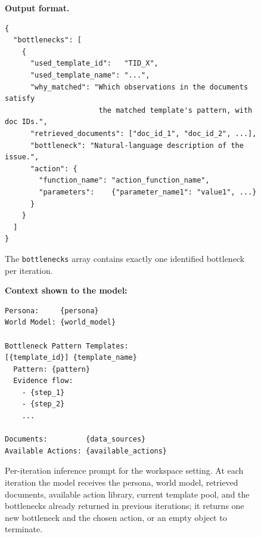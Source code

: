 \begin{figure}[!t]
\begin{tcolorbox}[colback=gray!5, colframe=gray!50,
                  boxrule=0.5pt, arc=2mm,
                  left=4pt, right=4pt, top=3pt, bottom=3pt]
\medskip
\textbf{Output format.}
\begin{verbatim}
{
  "bottlenecks": [
    {
      "used_template_id":   "TID_X",
      "used_template_name": "...",
      "why_matched": "Which observations in the documents satisfy
                      the matched template's pattern, with doc IDs.",
      "retrieved_documents": ["doc_id_1", "doc_id_2", ...],
      "bottleneck": "Natural-language description of the issue.",
      "action": {
        "function_name": "action_function_name",
        "parameters":    {"parameter_name1": "value1", ...}
      }
    }
  ]
}
\end{verbatim}
The \texttt{bottlenecks} array contains exactly one identified bottleneck per iteration.

\medskip
\textbf{Context shown to the model:}
\begin{verbatim}
Persona:     {persona}
World Model: {world_model}

Bottleneck Pattern Templates:
[{template_id}] {template_name}
  Pattern: {pattern}
  Evidence flow:
    - {step_1}
    - {step_2}
    ...

Documents:         {data_sources}
Available Actions: {available_actions}
\end{verbatim}
\end{tcolorbox}
\caption{Per-iteration inference prompt for the workspace setting. At each iteration the model receives the persona, world model, retrieved documents, available action library, current template pool, and the bottlenecks already returned in previous iterations; it returns one new bottleneck and the chosen action, or an empty object to terminate.}
\label{fig:prompt_inference_workspace}
\end{figure}